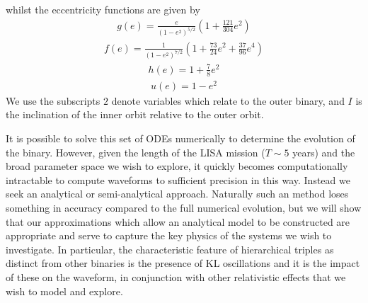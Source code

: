 \documentclass[a4paper,fleqn,usenatbib]{mnras}
\begin{document}
whilst the eccentricity functions are given by
\begin{eqnarray}
g(e) = \frac{e}{\left(1-e^{2}\right)^{5 / 2}}\left(1+\frac{121}{304} e^{2} \right)
\end{eqnarray}
\begin{eqnarray}
f(e) = \frac{1}{\left(1-e^{2}\right)^{7 / 2}}\left(1+\frac{73}{24} e^{2}+\frac{37}{96} e^{4}\right)
\end{eqnarray} 
\begin{eqnarray}
h(e) = 1 + \frac{7}{8} e^2
\end{eqnarray} 
\begin{eqnarray}
u(e) = 1 - e^2
\end{eqnarray} 
We use the subscripts $2$ denote variables which relate to the outer binary, and $I$ is the inclination of the inner orbit relative to the outer orbit. \newline 



\noindent It is possible to solve this set of ODEs numerically to determine the evolution of the binary. However, given the length of the LISA mission ($T \sim 5$ years) and the broad parameter space we wish to explore, it quickly becomes computationally intractable to compute waveforms to sufficient precision in this way. Instead we seek an analytical or semi-analytical approach. Naturally such an method loses something in accuracy compared to the full numerical evolution, but we will show that our approximations which allow an analytical model to be constructed are appropriate and serve to capture the key physics of the systems we wish to investigate. In particular, the characteristic feature of hierarchical triples as distinct from other binaries is the presence of KL oscillations and it is the impact of these on the waveform, in conjunction with other relativistic effects that we wish to model and explore. \newline
\end{document}

